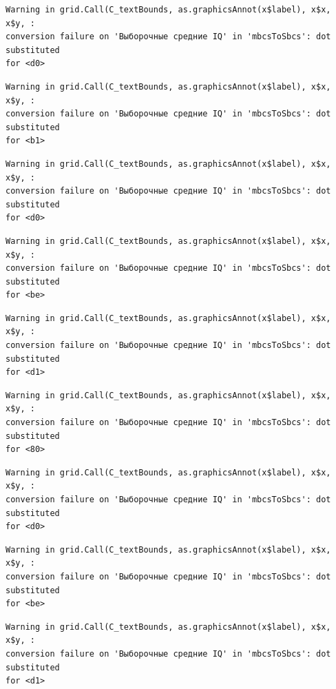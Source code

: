 \documentclass[
  letterpaper,
  DIV=11,
  numbers=noendperiod]{scrreprt}
\theoremstyle{definition}
\theoremstyle{remark}
\begin{document}
\begin{verbatim}
Warning in grid.Call(C_textBounds, as.graphicsAnnot(x$label), x$x, x$y, :
conversion failure on 'Выборочные средние IQ' in 'mbcsToSbcs': dot substituted
for <d0>
\end{verbatim}

\begin{verbatim}
Warning in grid.Call(C_textBounds, as.graphicsAnnot(x$label), x$x, x$y, :
conversion failure on 'Выборочные средние IQ' in 'mbcsToSbcs': dot substituted
for <b1>
\end{verbatim}

\begin{verbatim}
Warning in grid.Call(C_textBounds, as.graphicsAnnot(x$label), x$x, x$y, :
conversion failure on 'Выборочные средние IQ' in 'mbcsToSbcs': dot substituted
for <d0>
\end{verbatim}

\begin{verbatim}
Warning in grid.Call(C_textBounds, as.graphicsAnnot(x$label), x$x, x$y, :
conversion failure on 'Выборочные средние IQ' in 'mbcsToSbcs': dot substituted
for <be>
\end{verbatim}

\begin{verbatim}
Warning in grid.Call(C_textBounds, as.graphicsAnnot(x$label), x$x, x$y, :
conversion failure on 'Выборочные средние IQ' in 'mbcsToSbcs': dot substituted
for <d1>
\end{verbatim}

\begin{verbatim}
Warning in grid.Call(C_textBounds, as.graphicsAnnot(x$label), x$x, x$y, :
conversion failure on 'Выборочные средние IQ' in 'mbcsToSbcs': dot substituted
for <80>
\end{verbatim}

\begin{verbatim}
Warning in grid.Call(C_textBounds, as.graphicsAnnot(x$label), x$x, x$y, :
conversion failure on 'Выборочные средние IQ' in 'mbcsToSbcs': dot substituted
for <d0>
\end{verbatim}

\begin{verbatim}
Warning in grid.Call(C_textBounds, as.graphicsAnnot(x$label), x$x, x$y, :
conversion failure on 'Выборочные средние IQ' in 'mbcsToSbcs': dot substituted
for <be>
\end{verbatim}

\begin{verbatim}
Warning in grid.Call(C_textBounds, as.graphicsAnnot(x$label), x$x, x$y, :
conversion failure on 'Выборочные средние IQ' in 'mbcsToSbcs': dot substituted
for <d1>
\end{verbatim}
\end{document}
